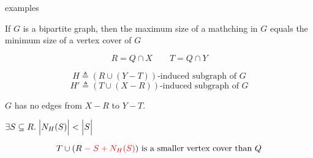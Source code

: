 \begin{frame}{}
\end{frame}

\begin{frame}{}
\end{frame}

\begin{frame}{}
    examples
\end{frame}

\begin{frame}{}
  \begin{theorem}
    If $G$ is a bipartite graph, then
    the maximum size of a mathching in $G$ equals
    the minimum size of a vertex cover of $G$
  \end{theorem}
\end{frame}

\begin{frame}{}

  \pause
  \[
    R = Q \cap X \qquad T = Q \cap Y
  \]

  \pause
  \[
    H \triangleq (R \cup (Y - T))\text{-induced subgraph of } G
  \]
  \[
    H' \triangleq (T \cup (X - R))\text{-induced subgraph of } G
  \]

  \pause
  \begin{center}
    $G$ has no edges from $X - R$ to $Y - T$.

    \pause
    \vspace{0.30cm}
  \end{center}
\end{frame}

\begin{frame}{}
  \begin{center}

    \pause

    \pause
    \vspace{0.30cm}
    $\exists S \subseteq R.\; \Big\lvert N_{H}(S) \Big\rvert < \Big\lvert S \Big\rvert$

    \pause
    \[
      T \cup (R \;\textcolor{red}{-\; S + N_{H}(S)}) \text{ is a smaller vertex cover than } Q
    \]
  \end{center}
\end{frame}

